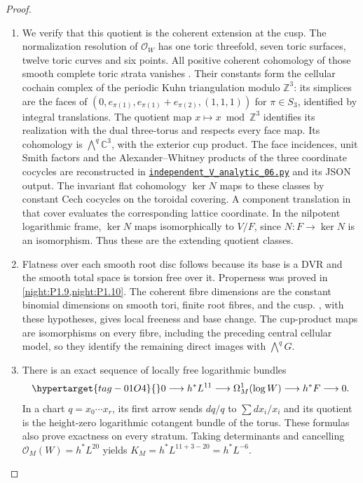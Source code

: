 \begin{proof}
\begin{enumerate}[label={$\langle1\rangle$\arabic*.}]
\item We verify that this quotient is the coherent extension at the cusp.
The normalization resolution of $\mathcal O_W$ has one toric
threefold, seven toric surfaces, twelve toric curves and six points.
All positive coherent cohomology of those smooth complete toric
strata vanishes \cite[Theorem 9.2.3, p.~410]{CoxLittleSchenck2011}. Their constants form the cellular cochain complex of the periodic
Kuhn triangulation modulo $\mathbb Z^3$: its simplices are the faces of
$(0,e_{\pi(1)},e_{\pi(1)}+e_{\pi(2)},(1,1,1))$ for
$\pi\in S_3$, identified by integral translations. The quotient map
$x\mapsto x\bmod\mathbb Z^3$ identifies its realization with the dual
three-torus and respects every face map. Its cohomology is
$\bigwedge^q\mathbb C^3$, with the exterior cup product.
The face incidences, unit Smith factors and the Alexander--Whitney
products of the three coordinate cocycles are reconstructed in
\href{https://github.com/KokunoYumeto/s6-complex-structure-workbench/blob/83d76022bcd442278b760db9ff438afceed6c6ea/pro_returns/S6_SERIES_GRIND_checkpoint_10_20261120T0211Z/code/current_audits/audit_corrections/code/independent_V_analytic_06.py}{\texttt{independent\_V\_analytic\_06.py}} and its JSON output.
The invariant flat cohomology $\ker N$ maps to these classes by
constant Cech cocycles on the toroidal covering. A component
translation in that cover evaluates the corresponding lattice
coordinate. In the nilpotent logarithmic frame, $\ker N$ maps
isomorphically to $V/F$, since $N:F\to\ker N$ is an isomorphism.
Thus these are the extending quotient classes.

\item Flatness over each smooth root disc follows because its base is a
DVR and the smooth total space is torsion free over it. Properness was proved in \cref{night:P1.9,night:P1.10}. The coherent fibre dimensions are the
constant binomial dimensions on smooth tori, finite root fibres,
and the cusp. \cite[\S7, Satz~5]{Grauert60}, with these hypotheses,
gives local freeness and base change. The cup-product maps are
isomorphisms on every fibre, including the preceding central
cellular model, so they identify the remaining direct images with
$\bigwedge^qG$.

\item There is an exact sequence of locally free logarithmic bundles
\begin{equation}\hypertarget{tag-01O4}{}\label{eq:P1Alogcotangent}
0\longrightarrow h^*L^{11}\longrightarrow\Omega_M^1(\log W)
 \longrightarrow h^*F\longrightarrow0.
\end{equation}
In a chart $q=x_0\cdots x_r$, its first arrow sends
$dq/q$ to $\sum dx_i/x_i$ and its quotient is the height-zero
logarithmic cotangent bundle of the torus. These formulas also
prove exactness on every stratum. Taking determinants and
cancelling $\mathcal O_M(W)=h^*L^{20}$ yields
$K_M=h^*L^{11+3-20}=h^*L^{-6}$.


\end{enumerate}
\end{proof}
